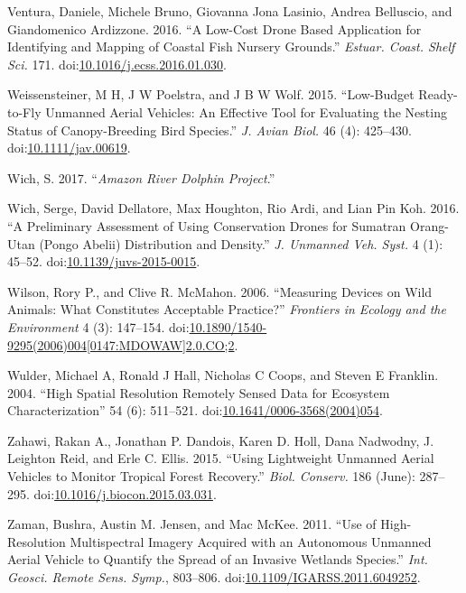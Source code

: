 \documentclass[]{interact}
\theoremstyle{plain}%
\theoremstyle{definition}
\theoremstyle{remark}
\begin{document}
\hypertarget{ref-ventura_low-cost_2016}{}
Ventura, Daniele, Michele Bruno, Giovanna Jona Lasinio, Andrea
Belluscio, and Giandomenico Ardizzone. 2016. ``A Low-Cost Drone Based
Application for Identifying and Mapping of Coastal Fish Nursery
Grounds.'' \emph{Estuar. Coast. Shelf Sci.} 171.
doi:\href{https://doi.org/10.1016/j.ecss.2016.01.030}{10.1016/j.ecss.2016.01.030}.

\hypertarget{ref-weissensteiner_low-budget_2015}{}
Weissensteiner, M H, J W Poelstra, and J B W Wolf. 2015. ``Low-Budget
Ready-to-Fly Unmanned Aerial Vehicles: An Effective Tool for Evaluating
the Nesting Status of Canopy-Breeding Bird Species.'' \emph{J. Avian
Biol.} 46 (4): 425--430.
doi:\href{https://doi.org/10.1111/jav.00619}{10.1111/jav.00619}.

\hypertarget{ref-WichS2017}{}
Wich, S. 2017. ``\emph{Amazon River Dolphin Project}.''

\hypertarget{ref-wich_preliminary_2016}{}
Wich, Serge, David Dellatore, Max Houghton, Rio Ardi, and Lian Pin Koh.
2016. ``A Preliminary Assessment of Using Conservation Drones for
Sumatran Orang-Utan (Pongo Abelii) Distribution and Density.'' \emph{J.
Unmanned Veh. Syst.} 4 (1): 45--52.
doi:\href{https://doi.org/10.1139/juvs-2015-0015}{10.1139/juvs-2015-0015}.

\hypertarget{ref-wilson_measuring_2006}{}
Wilson, Rory P., and Clive R. McMahon. 2006. ``Measuring Devices on Wild
Animals: What Constitutes Acceptable Practice?'' \emph{Frontiers in
Ecology and the Environment} 4 (3): 147--154.
doi:\href{https://doi.org/10.1890/1540-9295(2006)004\%5B0147:MDOWAW\%5D2.0.CO;2}{10.1890/1540-9295(2006)004{[}0147:MDOWAW{]}2.0.CO;2}.

\hypertarget{ref-wulder_high_2004}{}
Wulder, Michael A, Ronald J Hall, Nicholas C Coops, and Steven E
Franklin. 2004. ``High Spatial Resolution Remotely Sensed Data for
Ecosystem Characterization'' 54 (6): 511--521.
doi:\href{https://doi.org/10.1641/0006-3568(2004)054}{10.1641/0006-3568(2004)054}.

\hypertarget{ref-zahawi_using_2015}{}
Zahawi, Rakan A., Jonathan P. Dandois, Karen D. Holl, Dana Nadwodny, J.
Leighton Reid, and Erle C. Ellis. 2015. ``Using Lightweight Unmanned
Aerial Vehicles to Monitor Tropical Forest Recovery.'' \emph{Biol.
Conserv.} 186 (June): 287--295.
doi:\href{https://doi.org/10.1016/j.biocon.2015.03.031}{10.1016/j.biocon.2015.03.031}.

\hypertarget{ref-zaman_use_2011}{}
Zaman, Bushra, Austin M. Jensen, and Mac McKee. 2011. ``Use of
High-Resolution Multispectral Imagery Acquired with an Autonomous
Unmanned Aerial Vehicle to Quantify the Spread of an Invasive Wetlands
Species.'' \emph{Int. Geosci. Remote Sens. Symp.}, 803--806.
doi:\href{https://doi.org/10.1109/IGARSS.2011.6049252}{10.1109/IGARSS.2011.6049252}.

\newpage
\singlespacing 
\end{document}
